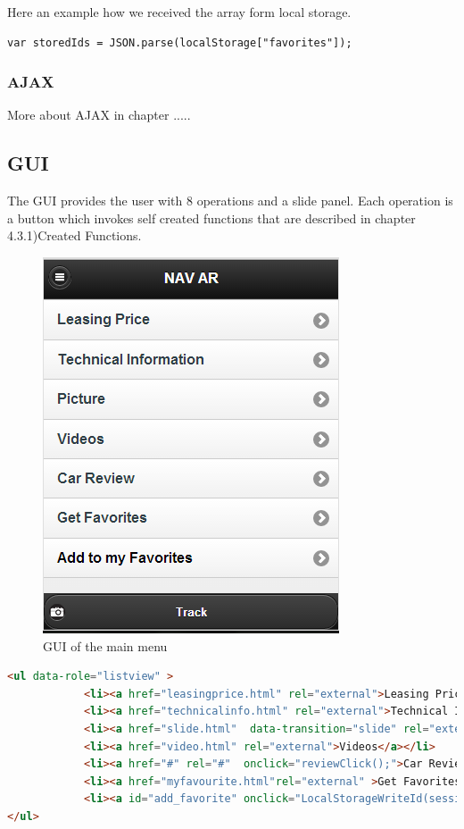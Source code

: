 Here an example how we received the array form local storage.
\\
\begin{lstlisting}[language=html, caption= 
start timer function,captionpos=b]
var storedIds = JSON.parse(localStorage["favorites"]);
\end{lstlisting}

\subsubsection{AJAX}
More about AJAX in chapter .....
\\
\newpage

\subsection{GUI}
The GUI provides the user with 8 operations and a slide panel. Each operation is a button which invokes self created functions that are described in chapter 4.3.1)Created Functions.
\\

\begin{figure}[h]
\centering
\includegraphics[width=0.5\linewidth]{graphics/chapter4/4}
\caption{GUI of the main menu}
\label{fig:5}
\end{figure}


\begin{lstlisting}[language=html, caption= 
GUI source code,captionpos=b]
<ul data-role="listview" >	
            <li><a href="leasingprice.html" rel="external">Leasing Price</a></li>
            <li><a href="technicalinfo.html" rel="external">Technical Information</a></li>
            <li><a href="slide.html"  data-transition="slide" rel="external">Picture</a></li>
            <li><a href="video.html" rel="external">Videos</a></li>
            <li><a href="#" rel="#"  onclick="reviewClick();">Car Review</a></li>
            <li><a href="myfavourite.html"rel="external" >Get Favorites</a></li>
			<li><a id="add_favorite" onclick="LocalStorageWriteId(sessionStorage.getItem('id'),globalcarname);" style="color:red" rel="external" >Add to my Favorites</a></li>
</ul>
\end{lstlisting}



